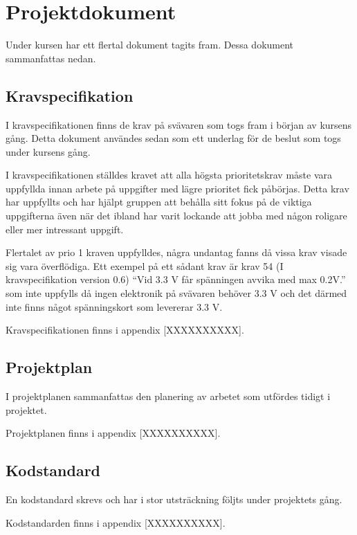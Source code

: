 \section{Projektdokument}
Under kursen har ett flertal dokument tagits fram. Dessa dokument sammanfattas nedan.
\subsection{Kravspecifikation}
I kravspecifikationen finns de krav på svävaren som togs fram i början av kursens gång. 
Detta dokument användes sedan som ett underlag för de beslut som togs under kursens gång.

I kravspecifikationen ställdes kravet att alla högsta prioritetskrav måste vara uppfyllda innan 
arbete på uppgifter med lägre prioritet fick påbörjas. Detta krav har uppfyllts och har hjälpt 
gruppen att behålla sitt fokus på de viktiga uppgifterna även när det ibland har varit lockande 
att jobba med någon roligare eller mer intressant uppgift.

Flertalet av prio 1 kraven uppfylldes, några undantag fanns då vissa krav visade sig vara överflödiga.
Ett exempel på ett sådant krav är krav 54 (I kravspecifikation version 0.6) ``Vid 3.3 V får spänningen
avvika med max 0.2V.'' som inte uppfylls då ingen elektronik på svävaren behöver 3.3 V och det därmed inte 
finns något spänningskort som levererar 3.3 V.

Kravspecifikationen finns i appendix [XXXXXXXXXX].
\subsection{Projektplan}
I projektplanen sammanfattas den planering av arbetet som utfördes tidigt i projektet.

Projektplanen finns i appendix [XXXXXXXXXX].
\subsection{Kodstandard}
En kodstandard skrevs och har i stor utsträckning följts under projektets gång.

Kodstandarden finns i appendix [XXXXXXXXXX].